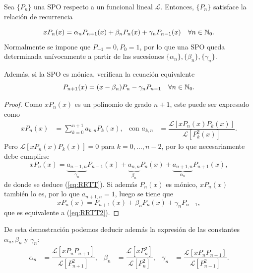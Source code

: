 \begin{teorema} 
    \label{th:RRTT}
    Sea $\{P_n\}$ una SPO respecto a un funcional lineal $\mathcal L$. Entonces, $\{P_n\}$ satisface la relación de recurrencia

    \begin{equation}
        \label{eq:RRTT}
        xP_n(x) = \alpha_n P_{n+1}(x) + \beta_n P_n(x) + \gamma_n P_{n-1}(x) \ \ \ \forall n\in\mathbb{N}_0.
    \end{equation}
    Normalmente se impone que $P_{-1}=0, P_0 = 1$, por lo que una SPO queda determinada unívocamente a partir de las sucesiones $\{\alpha_n\},\{\beta_n\},\{\gamma_n\}$.

    Además, si la SPO es mónica, verifican la ecuación equivalente
    \begin{equation}
        \label{eq:RRTT2}
        P_{n+1}(x) = (x-\beta_n) P_n - \gamma_n P_{n-1} \ \ \ \forall n\in\mathbb{N}_0.
    \end{equation}
    
\end{teorema}
\begin{proof}
    Como $xP_n(x)$ es un polinomio de grado $n+1$, este puede ser expresado como 
    \begin{align*}
        xP_n(x) &= \sum_{k=0}^{n+1} a_{k,n} P_k(x), & \text{con } a_{k,n}&= \dfrac{\mathcal{L}[xP_n(x)P_k(x)]}{\mathcal{L}[P_k^2(x)]}. 
    \end{align*}
    Pero $\mathcal{L}[xP_n(x)P_k(x)]=0$ para $k=0,\dots,n-2$, por lo que necesariamente debe cumplirse
    $$
    xP_n(x)  = \underbrace{a_{n-1,n}}_{\gamma_n} P_{n-1}(x) + \underbrace{a_{n,n}}_{\beta_n} P_n(x) + \underbrace{a_{n+1,n}}_{\alpha_n} P_{n+1}(x),
    $$
    de donde se deduce (\ref{eq:RRTT}). Si además $P_n(x)$ es mónico, $xP_n(x)$ también lo es, por lo que $a_{n+1,n}=1$, luego se tiene que 
    $$ xP_n(x)  = P_{n+1}(x) + \beta_n P_n(x) + \gamma_n P_{n-1}, $$ que es equivalente a (\ref{eq:RRTT2}).
\end{proof}

De esta demostración podemos deducir además la expresión de las constantes $\alpha_n, \beta_n$ y $\gamma_n$:
\begin{align}
    \label{eq:ctes-RRTT}
    \alpha_n &= \dfrac{\mathcal{L}[xP_n P_{n+1}]}{\mathcal{L}[P_{n+1}^2]}, & \beta_n &= \dfrac{\mathcal{L}[xP_n^2]}{\mathcal{L}[P_n^2]}, & \gamma_n &= \dfrac{\mathcal{L}[xP_n P_{n-1}]}{\mathcal{L}[P_{n-1}^2]}.
\end{align}

